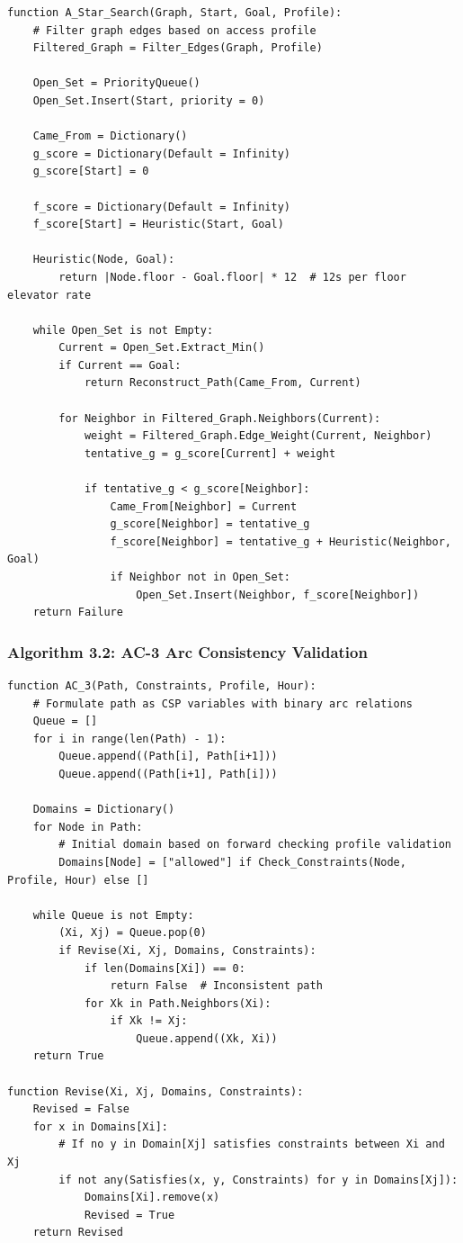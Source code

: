 \documentclass[12pt,a4paper]{report}
\begin{document}
\begin{verbatim}
function A_Star_Search(Graph, Start, Goal, Profile):
    # Filter graph edges based on access profile
    Filtered_Graph = Filter_Edges(Graph, Profile)
    
    Open_Set = PriorityQueue()
    Open_Set.Insert(Start, priority = 0)
    
    Came_From = Dictionary()
    g_score = Dictionary(Default = Infinity)
    g_score[Start] = 0
    
    f_score = Dictionary(Default = Infinity)
    f_score[Start] = Heuristic(Start, Goal)
    
    Heuristic(Node, Goal):
        return |Node.floor - Goal.floor| * 12  # 12s per floor elevator rate
        
    while Open_Set is not Empty:
        Current = Open_Set.Extract_Min()
        if Current == Goal:
            return Reconstruct_Path(Came_From, Current)
            
        for Neighbor in Filtered_Graph.Neighbors(Current):
            weight = Filtered_Graph.Edge_Weight(Current, Neighbor)
            tentative_g = g_score[Current] + weight
            
            if tentative_g < g_score[Neighbor]:
                Came_From[Neighbor] = Current
                g_score[Neighbor] = tentative_g
                f_score[Neighbor] = tentative_g + Heuristic(Neighbor, Goal)
                if Neighbor not in Open_Set:
                    Open_Set.Insert(Neighbor, f_score[Neighbor])
    return Failure
\end{verbatim}

\subsubsection*{Algorithm 3.2: AC-3 Arc Consistency Validation}

\begin{verbatim}
function AC_3(Path, Constraints, Profile, Hour):
    # Formulate path as CSP variables with binary arc relations
    Queue = []
    for i in range(len(Path) - 1):
        Queue.append((Path[i], Path[i+1]))
        Queue.append((Path[i+1], Path[i]))
        
    Domains = Dictionary()
    for Node in Path:
        # Initial domain based on forward checking profile validation
        Domains[Node] = ["allowed"] if Check_Constraints(Node, Profile, Hour) else []
        
    while Queue is not Empty:
        (Xi, Xj) = Queue.pop(0)
        if Revise(Xi, Xj, Domains, Constraints):
            if len(Domains[Xi]) == 0:
                return False  # Inconsistent path
            for Xk in Path.Neighbors(Xi):
                if Xk != Xj:
                    Queue.append((Xk, Xi))
    return True

function Revise(Xi, Xj, Domains, Constraints):
    Revised = False
    for x in Domains[Xi]:
        # If no y in Domain[Xj] satisfies constraints between Xi and Xj
        if not any(Satisfies(x, y, Constraints) for y in Domains[Xj]):
            Domains[Xi].remove(x)
            Revised = True
    return Revised
\end{verbatim}
\end{document}
